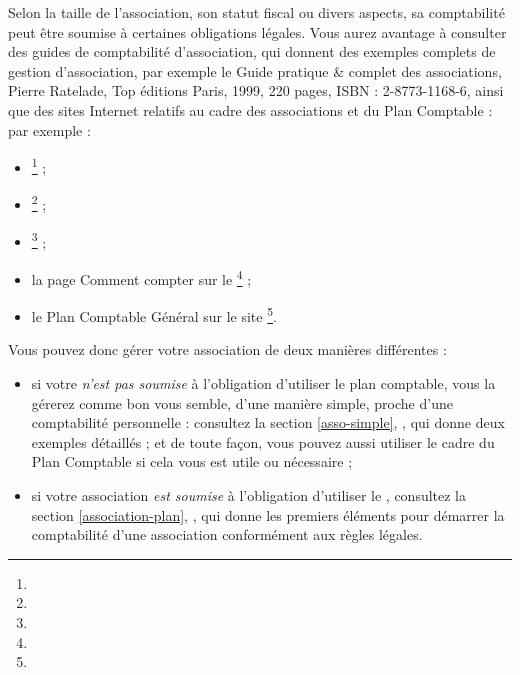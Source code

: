 Selon la taille de l'association, son statut fiscal ou divers aspects, sa comptabilité peut être soumise à certaines obligations légales. Vous aurez avantage à consulter des guides de comptabilité d'association, qui donnent des exemples complets de gestion d'association, par exemple le Guide pratique \& complet des associations, Pierre Ratelade,  Top éditions Paris, 1999, 220 pages, ISBN : 2-8773-1168-6, ainsi que des sites Internet relatifs au cadre des associations et du Plan Comptable :
par exemple :

\begin{itemize}
	\item {}\footnote{\urlPlanComptable{}} ;
	\item {}\footnote{\urlPlanDeComptes{}} ;	
	\item {}\footnote{\urlMaisonAssociations{}} ;
	\item la page \og Comment compter \fg{} sur le \footnote{\urlAssociationsGouv{}} ;
	\item le Plan Comptable Général sur le site \footnote{\urlComptaOnLine{}}.
\end{itemize}

\newpage

Vous pouvez donc gérer votre association de deux manières différentes :
\begin{itemize}
	\item si votre  \emph{n'est pas soumise} à l'obligation d'utiliser le \Gls{plan comptable}, vous la gérerez comme bon vous semble, d'une manière simple, proche d'une comptabilité personnelle : consultez la section \vref{asso-simple}, , qui donne deux exemples détaillés ; et de toute façon, vous pouvez aussi utiliser le cadre du Plan Comptable si cela vous est utile ou nécessaire ;
	\item si votre association \emph{est soumise} à l'obligation d'utiliser le , consultez la section \vref{association-plan}, , qui donne les premiers éléments pour démarrer la comptabilité d'une association conformément aux règles légales. 
\end{itemize}



